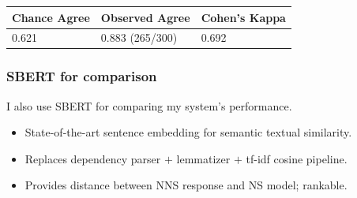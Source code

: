 \documentclass[handout,xcolor={dvipsnames}]{beamer}
\newcommand{\param}[1]{\texttt{#1}}
\begin{document}
\begin{frame}
\begin{table}[htb!]
\begin{center}
\begin{tabular}{|l|l|l|}
\hline
 Chance Agree & Observed Agree & Cohen's Kappa \\
\hline
0.621 & 0.883 (265/300) & 0.692 \\
\hline
\end{tabular}
\end{center}
\end{table}


\end{frame}

\begin{frame}
\frametitle{SBERT for comparison}
I also use SBERT for comparing my system's performance.
\vspace{.3em}
\begin{itemize}
\pause
\item State-of-the-art sentence embedding for semantic textual similarity.
\vspace{.3em}
\pause
\item Replaces dependency parser $+$ lemmatizer $+$ tf-idf cosine pipeline. 
\vspace{.3em}
\pause
\item Provides distance between NNS response and NS model; rankable.
\end{itemize}
\end{frame}
\end{document}
